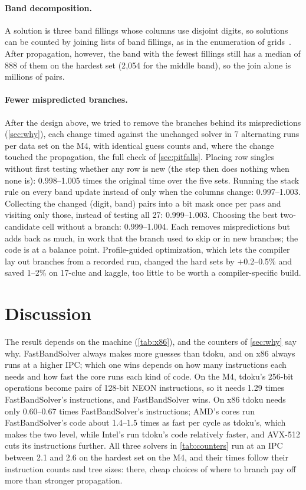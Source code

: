 \documentclass[11pt]{article}
\theoremstyle{definition}
\theoremstyle{plain}
\begin{document}
\paragraph{Band decomposition.} A solution is three band fillings whose columns use disjoint digits, so solutions can
be counted by joining lists of band fillings, as in the enumeration of grids~\cite{felgenhauer2006mathematics}. After
propagation, however, the band with the fewest fillings still has a median of 888 of them on the hardest set (2{,}054
for the middle band), so the join alone is millions of pairs.

\paragraph{Fewer mispredicted branches.} After the design above, we tried to remove the branches behind its
mispredictions (\cref{sec:why}), each change timed against the unchanged solver in 7 alternating runs per data set on
the M4, with identical guess counts and, where the change touched the propagation, the full check of
\cref{sec:pitfalls}. Placing row singles without first testing whether any row is new (the step then does nothing when
none is): 0.998--1.005 times the original time over the five sets. Running the stack rule on every band update instead
of only when the columns change: 0.997--1.003. Collecting the changed (digit, band) pairs into a bit mask once per pass
and visiting only those, instead of testing all 27: 0.999--1.003. Choosing the best two-candidate cell without a
branch: 0.999--1.004. Each removes mispredictions but adds back as much, in work that the branch used to skip or in new
branches; the code is at a balance point. Profile-guided optimization, which lets the compiler lay out branches from a
recorded run, changed the hard sets by $+$0.2--0.5\% and saved 1--2\% on 17-clue and kaggle, too little to be
worth a compiler-specific build.

\section{Discussion}

The result depends on the machine (\cref{tab:x86}), and the counters of \cref{sec:why} say why. FastBandSolver
always makes more guesses than tdoku, and on x86 always runs at a higher IPC; which one wins depends on how many
instructions each needs and how fast the core runs each kind of code. On the M4, tdoku's 256-bit operations become
pairs of 128-bit NEON instructions, so it needs 1.29 times FastBandSolver's instructions, and FastBandSolver wins. On
x86 tdoku needs only 0.60--0.67 times FastBandSolver's instructions; AMD's cores run FastBandSolver's code about 1.4--1.5
times as fast per cycle as tdoku's, which makes the two level, while Intel's run tdoku's code relatively faster, and
AVX-512 cuts its instructions further. All three solvers in \cref{tab:counters} run at an IPC between 2.1 and 2.6 on
the hardest set on the M4, and their times follow their instruction counts and tree sizes: there, cheap choices of where to branch pay
off more than stronger propagation.
\end{document}
